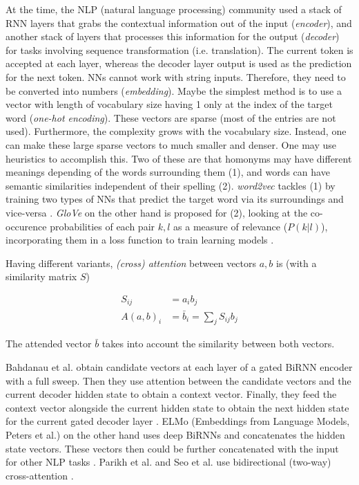 \documentclass{article}
\begin{document}
At the time, the NLP (natural language processing) community used a stack of RNN layers that grabs the contextual information out of the input (\textit{encoder}), and another stack of layers that processes this information for the output (\textit{decoder}) for tasks involving sequence transformation (i.e. translation). The current token is accepted at each layer, whereas the decoder layer output is used as the prediction for the next token. NNs cannot work with string inputs. Therefore, they need to be converted into numbers (\textit{embedding}). Maybe the simplest method is to use a vector with length of vocabulary size having 1 only at the index of the target word (\textit{one-hot encoding}). These vectors are sparse (most of the entries are not used). Furthermore, the complexity grows with the vocabulary size. Instead, one can make these large sparse vectors to much smaller and denser. One may use heuristics to accomplish this. Two of these are that homonyms may have different meanings depending of the words surrounding them (1), and words can have semantic similarities independent of their spelling (2). \textit{word2vec} tackles (1) by training two types of NNs that predict the target word via its surroundings and vice-versa \cite{mikolov_efficient_2013}. \textit{GloVe} on the other hand is proposed for (2), looking at the co-occurence probabilities of each pair $k, l$ as a measure of relevance ($P(k|l)$), incorporating them in a loss function to train learning models \cite{pennington_glove_2014}.     

Having different variants, \textit{(cross) attention} between vectors $a, b$ is (with a similarity matrix $S$)

\begin{align}
    S_{ij} &= a_i b_j\\
    A(a,b)_{i} &= \bar{b}_{i} = \sum_j S_{ij} b_j
\end{align}

The attended vector $\bar{b}$ takes into account the similarity between both vectors.

Bahdanau et al. obtain candidate vectors at each layer of a gated BiRNN encoder with a full sweep. Then they use attention between the candidate vectors and the current decoder hidden state to obtain a context vector. Finally, they feed the context vector alongside the current hidden state to obtain the next hidden state for the current gated decoder layer \cite{bahdanau_neural_2016}. ELMo (Embeddings from Language Models, Peters et al.) on the other hand uses deep BiRNNs and concatenates the hidden state vectors. These vectors then could be further concatenated with the input for other NLP tasks \cite{peters_deep_2018}. Parikh et al. and Seo et al. use bidirectional (two-way) cross-attention \cite{parikh_decomposable_2016, seo_bidirectional_2018}.
\end{document}
